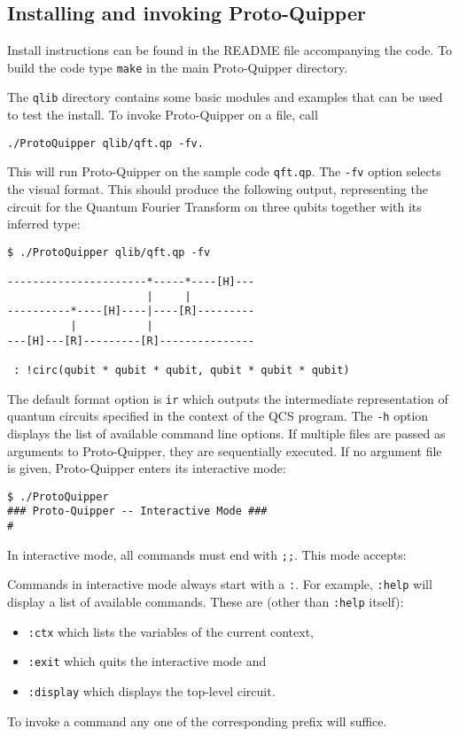 \subsection{Installing and invoking Proto-Quipper}

Install instructions can be found in the README file accompanying the code. 
To build the code type \verb#make# in the main Proto-Quipper directory. 

The \verb#qlib# directory contains some basic modules and examples that can 
be used to test the install. To invoke Proto-Quipper on a file, call 
\begin{verbatim}
./ProtoQuipper qlib/qft.qp -fv.
\end{verbatim}
This will run Proto-Quipper on the sample code \verb#qft.qp#. The \verb#-fv# option selects the visual format. 
This should produce the following output, representing the circuit for the 
Quantum Fourier Transform on three qubits together with its inferred 
type:
\begin{verbatim}
$ ./ProtoQuipper qlib/qft.qp -fv

----------------------*-----*----[H]---
                      |     |          
----------*----[H]----|----[R]---------
          |           |                
---[H]---[R]---------[R]---------------

 : !circ(qubit * qubit * qubit, qubit * qubit * qubit)
\end{verbatim}
The default format option is \verb#ir# which outputs the intermediate representation of quantum circuits specified in the context of the QCS program. The \verb#-h# option displays the list of available command line 
options. If multiple files are passed as arguments to Proto-Quipper, they 
are sequentially executed. If no argument file is given, Proto-Quipper 
enters its interactive mode:
\begin{verbatim}
$ ./ProtoQuipper
### Proto-Quipper -- Interactive Mode ###
# 
\end{verbatim}
In interactive mode, all commands must end with \verb#;;#. This mode accepts:
Commands in interactive mode always start with a \verb#:#. For example, 
\verb#:help# will display a list of available commands. These are (other 
than \verb#:help# itself): 
\begin{itemize}
  \item \verb#:ctx# which lists the variables of the current context, 
  \item \verb#:exit# which quits the interactive mode and
  \item \verb#:display# which displays the top-level circuit.
\end{itemize}
To invoke a command any one of the corresponding prefix will suffice.

